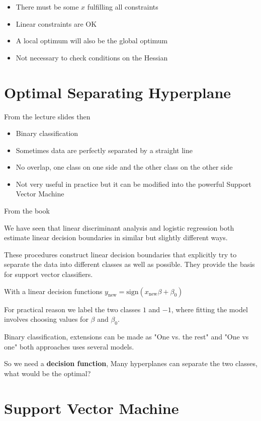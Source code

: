 \begin{itemize}
  \item There must be some $x$ fulfilling all constraints
  \item Linear constraints are OK
  \item A local optimum will also be the global optimum
  \item Not necessary to check conditions on the Hessian
\end{itemize}

\section{Optimal Separating Hyperplane}

From the lecture slides \cite[p.~16]{lecture5} then

\begin{itemize}
  \item Binary classification
  \item Sometimes data are perfectly separated by a straight line
  \item No overlap, one class on one side and the other class on the other side
  \item Not very useful in practice but it can be modified into the powerful Support Vector Machine
\end{itemize}

From the book \cite[p.~130]{friedman2016elements}

We have seen that linear discriminant analysis and logistic regression both estimate linear decision boundaries in similar but slightly different ways.

These procedures construct linear decision boundaries that explicitly try to separate the data into different classes as well as possible. They provide the basis for support vector classifiers.

With a linear decision functions $y_\text{new}  = \text{sign}(x_\text{new} \beta + \beta_0) $

For practical reason we label the two classes $1$ and $-1$, where fitting the model involves choosing values for $\beta$ and $\beta_0$.

Binary classification, extensions can be made as "One vs. the rest" and "One vs one" both approaches uses several models.

So we need a \textbf{decision function}, Many hyperplanes can separate the two classes, what would be the optimal?

\section{Support Vector Machine}

